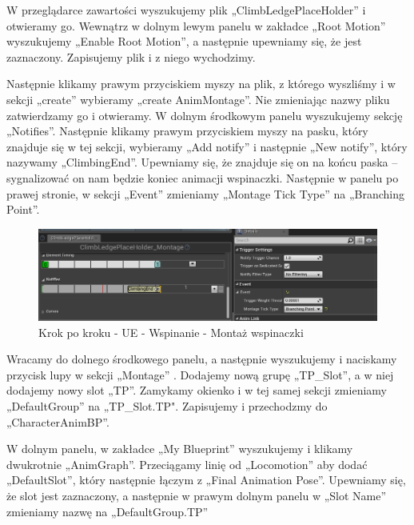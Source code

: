 \documentclass[openright]{xmgr}
\begin{document}
W przeglądarce zawartości wyszukujemy plik „ClimbLedgePlaceHolder” i otwieramy go. Wewnątrz w dolnym lewym panelu w zakładce „Root Motion” wyszukujemy „Enable Root Motion”, a następnie upewniamy się, że jest zaznaczony. Zapisujemy plik i z niego wychodzimy. 

Następnie klikamy prawym przyciskiem myszy na plik, z którego wyszliśmy i w sekcji „create” wybieramy „create AnimMontage”. Nie zmieniając nazwy pliku zatwierdzamy go i otwieramy. W dolnym środkowym panelu wyszukujemy sekcję „Notifies”. Następnie klikamy prawym przyciskiem myszy na pasku, który znajduje się w tej sekcji, wybieramy „Add notify” i następnie „New notify”, który nazywamy „ClimbingEnd”. Upewniamy się, że znajduje się on na końcu paska – sygnalizować on nam będzie koniec animacji wspinaczki. Następnie w panelu po prawej stronie, w sekcji „Event” zmieniamy „Montage Tick Type” na „Branching Point”.

\begin{figure}[!htb]
    \begin{center}
    \includegraphics[scale=0.5]{Screeny/UeKrokPoKroku/MontageNotify}
    \end{center}
    \caption{Krok po kroku - UE - Wspinanie - Montaż wspinaczki}
\end{figure}

\newpage
Wracamy do dolnego środkowego panelu, a następnie wyszukujemy i naciskamy przycisk lupy w sekcji „Montage” . Dodajemy nową grupę „TP\_Slot”, a w niej dodajemy nowy slot „TP”. Zamykamy okienko i w tej samej sekcji zmieniamy „DefaultGroup” na „TP\_Slot.TP". Zapisujemy i przechodzmy do „CharacterAnimBP”.

W dolnym panelu, w zakładce „My Blueprint” wyszukujemy i klikamy dwukrotnie „AnimGraph”. Przeciągamy linię od „Locomotion” aby dodać „DefaultSlot”, który następnie łączym z „Final Animation Pose”.  Upewniamy się, że slot jest zaznaczony, a następnie w prawym dolnym panelu w „Slot Name” zmieniamy nazwę na „DefaultGroup.TP”
\end{document}
